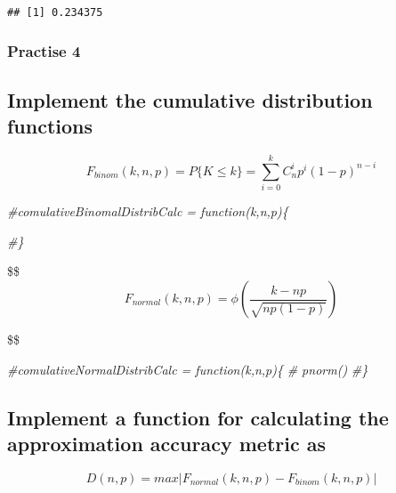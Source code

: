 \documentclass[
]{article}
\newenvironment{Shaded}{\begin{snugshade}}{\end{snugshade}}
\newcommand{\CommentTok}[1]{\textcolor[rgb]{0.56,0.35,0.01}{\textit{#1}}}
\begin{document}
\begin{verbatim}
## [1] 0.234375
\end{verbatim}

\hypertarget{practise-4}{%
\subsubsection{Practise 4}\label{practise-4}}

\hypertarget{implement-the-cumulative-distribution-functions}{%
\subsection{Implement the cumulative distribution
functions}\label{implement-the-cumulative-distribution-functions}}

\[
  \begin{equation*}
    F_{binom}(k,n,p)= P\{K \leq k\} = \sum_{i=0}^k C_n^i p^i(1-p)^{n-i} 
  \end{equation*}     
\]

\begin{Shaded}
\begin{Highlighting}[]
\CommentTok{\#comulativeBinomalDistribCalc = function(k,n,p)\{}

  
\CommentTok{\#\}}
\end{Highlighting}
\end{Shaded}

\$\$ \begin{equation*}
    F_{normal}(k,n,p)= \phi \left( \frac{k-np}{\sqrt{np(1-p)}} \right)
  \end{equation*}

\$\$

\begin{Shaded}
\begin{Highlighting}[]
\CommentTok{\#comulativeNormalDistribCalc = function(k,n,p)\{}
 \CommentTok{\# pnorm()}
\CommentTok{\#\}}
\end{Highlighting}
\end{Shaded}

\hypertarget{implement-a-function-for-calculating-the-approximation-accuracy-metric-as}{%
\subsection{Implement a function for calculating the approximation
accuracy metric
as}\label{implement-a-function-for-calculating-the-approximation-accuracy-metric-as}}

\[
  D(n,p) = max|F_{normal}(k,n,p) - F_{binom}(k,n,p)| 
\]
\end{document}
